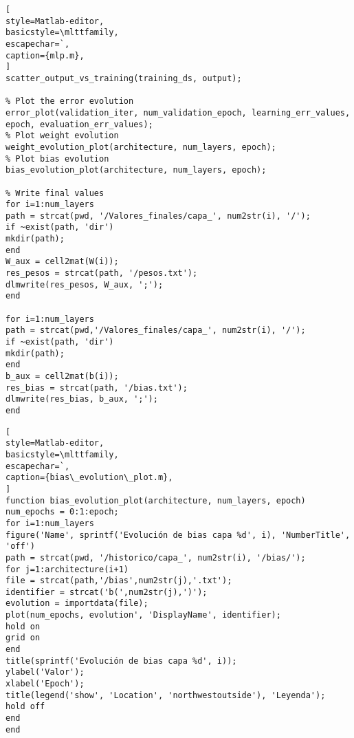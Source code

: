 \documentclass[6pt]{article}
\begin{document}
\begin{lstlisting}[
style=Matlab-editor,
basicstyle=\mlttfamily,
escapechar=`,
caption={mlp.m},
]
scatter_output_vs_training(training_ds, output);

% Plot the error evolution
error_plot(validation_iter, num_validation_epoch, learning_err_values, epoch, evaluation_err_values);
% Plot weight evolution
weight_evolution_plot(architecture, num_layers, epoch);
% Plot bias evolution
bias_evolution_plot(architecture, num_layers, epoch);

% Write final values
for i=1:num_layers
path = strcat(pwd, '/Valores_finales/capa_', num2str(i), '/');
if ~exist(path, 'dir')
mkdir(path);
end
W_aux = cell2mat(W(i));
res_pesos = strcat(path, '/pesos.txt');
dlmwrite(res_pesos, W_aux, ';');
end

for i=1:num_layers
path = strcat(pwd,'/Valores_finales/capa_', num2str(i), '/');
if ~exist(path, 'dir')
mkdir(path);
end
b_aux = cell2mat(b(i));
res_bias = strcat(path, '/bias.txt');
dlmwrite(res_bias, b_aux, ';');
end
\end{lstlisting}

\begin{lstlisting}[
style=Matlab-editor,
basicstyle=\mlttfamily,
escapechar=`,
caption={bias\_evolution\_plot.m},
]
function bias_evolution_plot(architecture, num_layers, epoch)
num_epochs = 0:1:epoch;
for i=1:num_layers
figure('Name', sprintf('Evolución de bias capa %d', i), 'NumberTitle', 'off')
path = strcat(pwd, '/historico/capa_', num2str(i), '/bias/');
for j=1:architecture(i+1)
file = strcat(path,'/bias',num2str(j),'.txt');
identifier = strcat('b(',num2str(j),')');
evolution = importdata(file);
plot(num_epochs, evolution', 'DisplayName', identifier);
hold on
grid on
end
title(sprintf('Evolución de bias capa %d', i));
ylabel('Valor');
xlabel('Epoch');
title(legend('show', 'Location', 'northwestoutside'), 'Leyenda');
hold off
end
end
\end{lstlisting}
\end{document}
